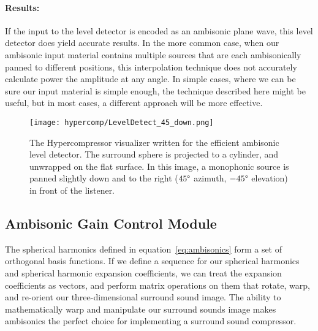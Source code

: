 \paragraph{Results:}If the input to the level detector is encoded as
an ambisonic plane wave, this level detector does yield accurate
results.  In the more common case, when our ambisonic input material
contains multiple sources that are each ambisonically panned to
different positions, this interpolation technique does not accurately
calculate power the amplitude at any angle.  In simple cases, where we
can be sure our input material is simple enough, the technique
described here might be useful, but in most cases, a different
approach will be more effective.

\begin{figure}[h]
  \texttt{[image: hypercomp/LevelDetect\_45\_down.png]}
  \caption{The Hypercompressor visualizer written for the efficient
    ambisonic level detector. The surround sphere is projected to a
    cylinder, and unwrapped on the flat surface. In this image, a
    monophonic source is panned slightly down and to the right
    ($45\degree$ azimuth, $-45\degree$ elevation) in front of the
    listener.}
  \label{fig:hypercomp-inf-map-angle}
\end{figure}

\subsection{Ambisonic Gain Control Module}
\label{sec:ambis-gain-contr}
 The spherical
harmonics defined in equation~\ref{eq:ambisonics} form a set of
orthogonal basis functions. If we define a sequence for our spherical
harmonics and spherical harmonic expansion coefficients, we can treat
the expansion coefficients as vectors, and perform matrix operations
on them that rotate, warp, and re-orient our three-dimensional
surround sound image.\cite{Anderson2009} The ability to
mathematically warp and manipulate our surround sounds image makes
ambisonics the perfect choice for implementing a surround sound
compressor.


